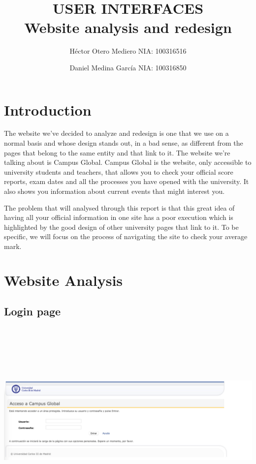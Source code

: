 \documentclass{article}
\title{\TitleFont USER INTERFACES \\ Website analysis and redesign \vspace{10cm}}
\author{Héctor Otero Mediero NIA: 100316516 \\ \and Daniel Medina García NIA: 100316850}
\begin{document}
\begin{titlepage}
\end{titlepage}
\maketitle
\thispagestyle{empty}
\newpage
\doublespace
\tableofcontents
\thispagestyle{empty}
\newpage
\singlespace
\section{Introduction}
The website we’ve decided to analyze and redesign is one that we use on a normal basis and whose design stands out, in a bad sense, as different  from the pages that belong to the same entity and that link to it. The website we’re talking about is Campus Global. Campus Global is the website, only accessible to university students and teachers, that allows you to check your official score reports, exam dates and all the processes you have opened with the university. It also shows you information about current events that might interest you. 


The problem that will analysed through this report is that this great idea of having all your official information in one site has a poor execution which is highlighted by the good design of other university pages that link to it. To be specific, we will focus on the process of navigating the site to check your average mark.

\section{Website Analysis}
\subsection{Login page}

\includegraphics[width=15cm, height=10cm, keepaspectratio]{loginpage} 
\end{document}
